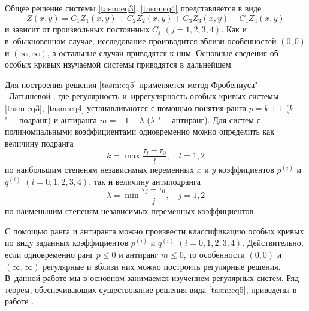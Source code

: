Общее решение \cite{tasm:1} системы \eqref{tasm:eq3}, \eqref{tasm:eq4}  представляется  в виде
\begin{equation}
Z(x,y)=C_{1}    Z_{1}(x,y)+C_{2}    Z_{2}(x,y)+C_{3}   
Z_{3}(x,y)+C_{4}    Z_{4}(x,y)
\label{tasm:eq8}
\end{equation}
и зависит от произвольных постоянных $C_{j}$ $(j=1, 2, 3, 4)$. 
Как и в~обыкновенном случае, исследование производится вблизи особенностей $(0, 0)$ и $(\infty, \infty)$, а остальные случаи
приводятся к ним. 
Основные сведения об особых кривых изучаемой системы приводятся в дальнейшем.

Для построения решения \eqref{tasm:eq5}  применяется метод Фробениуса"--~Латышевой \cite{tasm:3}, где регулярность и~иррегулярность особых кривых системы \eqref{tasm:eq3}, \eqref{tasm:eq4} устанавливаются с помощью понятия ранга $p=k+1$ ($k$ "--- подранг) и антиранга $m=-1-\lambda$ ($\lambda$ "--- антиранг).
Для систем с полиномиальными коэффициентами одновременно можно определить как величину подранга 
$$
k=\max\frac{\tau_{l}-\tau_{0}}{l},\quad  l=1, 2
$$
по наибольшим степеням независимых переменных $x$ и $y$
коэффициентов $p^{(i)}$ и $q^{(i)}$ $(i=0, 1, 2, 3, 4)$, так
и величину антиподранга 
$$
\lambda=\min\frac{\tau_{j}-\tau_{0}}{j},\quad  j=1, 2
$$
по наименьшим степеням независимых переменных коэффициентов.

С помощью ранга и антиранга можно произвести классификацию особых кривых по виду заданных коэффициентов $p^{(i)}$ и $q^{(i)}$ 
$(i=0, 1, 2, 3, 4)$. Действительно, если одновременно ранг $p\leq0$ и антиранг $m\leq0$, то особенности $(0, 0)$ и
$(\infty, \infty)$ регулярные и вблизи них можно построить регулярные решения. 
В~данной работе  мы в основном занимаемся изучением регулярных систем. 
Ряд теорем, обеспечивающих существование решения вида \eqref{tasm:eq5}, приведены в работе \cite{tasm:4}.

\smallskip

